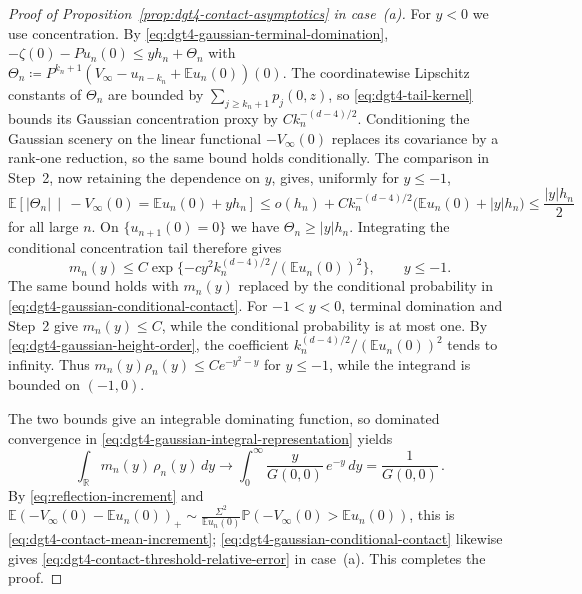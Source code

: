 \documentclass[11pt]{amsart}
\theoremstyle{plain}
\theoremstyle{definition}
\newcommand{\R}{\mathbb{R}}
\newcommand{\E}{\mathbb{E}}
\renewcommand{\P}{\mathbb{P}}
\begin{document}
\begin{proof}[Proof of Proposition~\ref{prop:dgt4-contact-asymptotics} in case~\textup{(a)}]
		For $y<0$ we use concentration. By \eqref{eq:dgt4-gaussian-terminal-domination},
		$-\zeta(0)-Pu_n(0)\leq yh_n+\Theta_n$ with $\Theta_n\coloneqq P^{k_n+1}(V_\infty-u_{n-k_n}+\E u_n(0))(0)$.
		The coordinatewise Lipschitz constants of $\Theta_n$ are bounded by
		$\sum_{j\geq k_n+1}p_j(0,z)$, so \eqref{eq:dgt4-tail-kernel} bounds its Gaussian concentration proxy by
		$Ck_n^{-(d-4)/2}$. Conditioning the Gaussian scenery on the linear functional
		$-V_\infty(0)$ replaces its covariance by a rank-one reduction, so the same bound holds conditionally. The comparison in Step~2, now retaining the dependence on $y$, gives, uniformly for $y\leq-1$,
		\[
			\E\left[|\Theta_n|\,\middle|\,-V_\infty(0)=\E u_n(0)+yh_n\right]
			\leq o(h_n)+Ck_n^{-(d-4)/2}\bigl(\E u_n(0)+|y|h_n\bigr)
			\leq\frac{|y|h_n}{2}
		\]
		for all large $n$. On $\{u_{n+1}(0)=0\}$ we have $\Theta_n\geq|y|h_n$. Integrating the conditional concentration tail therefore gives
		\begin{equation}\label{eq:dgt4-gaussian-conditional-concentration}
			m_n(y)\leq C\exp\{-cy^2k_n^{(d-4)/2}/(\E u_n(0))^2\},
			\qquad y\leq-1.
		\end{equation}
		The same bound holds with $m_n(y)$ replaced by the conditional probability in
		\eqref{eq:dgt4-gaussian-conditional-contact}. For $-1<y<0$, terminal domination and Step~2 give $m_n(y)\leq C$, while the conditional probability is at most one. By \eqref{eq:dgt4-gaussian-height-order}, the coefficient
		$k_n^{(d-4)/2}/(\E u_n(0))^2$ tends to infinity. Thus
		$m_n(y)\rho_n(y)\leq Ce^{-y^2-y}$ for $y\leq-1$, while the integrand is bounded on $(-1,0)$.

	The two bounds give an integrable dominating function, so dominated convergence in
	\eqref{eq:dgt4-gaussian-integral-representation} yields
	\[
		\int_\R m_n(y)\,\rho_n(y)\,dy\longrightarrow\int_0^\infty\frac{y}{G(0,0)}\,e^{-y}\,dy=\frac1{G(0,0)}\, .
	\]
	By \eqref{eq:reflection-increment} and
	$\E(-V_\infty(0)-\E u_n(0))_+\sim\frac{\Sigma^2}{\E u_n(0)}\P(-V_\infty(0)>\E u_n(0))$,
	this is \eqref{eq:dgt4-contact-mean-increment};
	\eqref{eq:dgt4-gaussian-conditional-contact} likewise gives
	\eqref{eq:dgt4-contact-threshold-relative-error} in case~\textup{(a)}. This completes the proof.
\end{proof}
\end{document}
